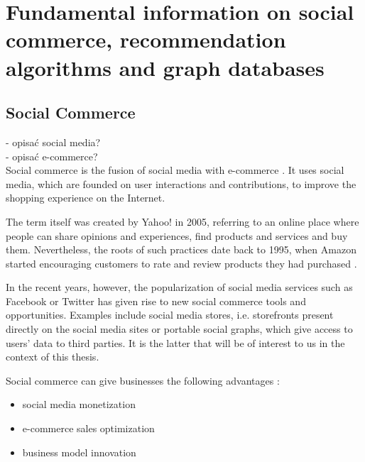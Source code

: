 \documentclass[12pt]{report}
\begin{document}




\chapter[Fundamental information on social...]{Fundamental information on social commerce, recommendation algorithms and graph databases} \label{fundamental_info}

\section{Social Commerce}

- opisać social media?\\
- opisać e-commerce?\\

Social commerce is the fusion of social media with e-commerce \cite{social_commerce_syzygy}. It uses social media, which are founded on user interactions and contributions, to improve the shopping experience on the Internet.

The term itself was created by Yahoo! in 2005, referring to an online place where people can share opinions and experiences, find products and services and buy them. Nevertheless, the roots of such practices date back to 1995, when Amazon started encouraging customers to rate and review products they had purchased \cite{social_commerce_syzygy}.

In the recent years, however, the popularization of social media services such as Facebook or Twitter has given rise to new social commerce tools and opportunities. Examples include social media stores, i.e. storefronts present directly on the social media sites or portable social graphs, which give access to users' data to third parties. It is the latter that will be of interest to us in the context of this thesis.


Social commerce can give businesses the following advantages \cite{social_commerce_syzygy}:
\begin{itemize}
\item social media monetization
\item e-commerce sales optimization
\item business model innovation
\end{itemize}
\end{document}
